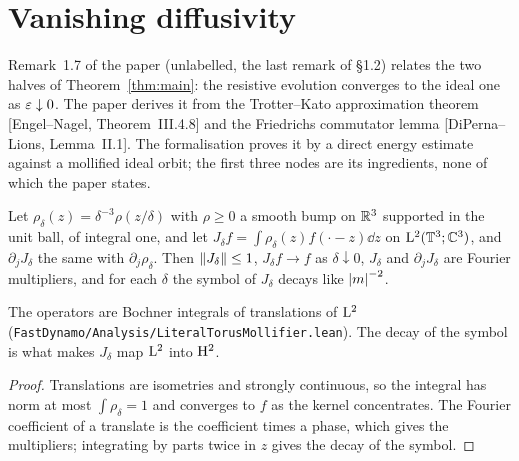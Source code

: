 \section{Vanishing diffusivity}

Remark~1.7 of the paper (unlabelled, the last remark of §1.2) relates the two halves of
Theorem~\ref{thm:main}: the resistive evolution converges to the ideal one as
$\varepsilon\downarrow0$.  The paper derives it from the Trotter--Kato approximation theorem
[Engel--Nagel, Theorem~III.4.8] and the Friedrichs commutator lemma [DiPerna--Lions,
Lemma~II.1].  The formalisation proves it by a direct energy estimate against a mollified ideal
orbit; the first three nodes are its ingredients, none of which the paper states.

\begin{lemma}
  \label{lem:vanishing:mollifier}
  \leanok
  Let $\rho_\delta(z)=\delta^{-3}\rho(z/\delta)$ with $\rho\geq0$ a smooth bump on $\mathbb{R}^3$
  supported in the unit ball, of integral one, and let $J_\delta f=\int\rho_\delta(z)f(\cdot-z)\dd z$
  on $\mathrm{L}^2(\mathbb{T}^3;\mathbb{C}^3)$, and $\partial_jJ_\delta$ the same with $\partial_j\rho_\delta$.  Then
  $\left\|J_\delta\right\|\leq1$, $J_\delta f\to f$ as $\delta\downarrow0$, $J_\delta$ and
  $\partial_jJ_\delta$ are Fourier multipliers, and for each $\delta$ the symbol of $J_\delta$
  decays like $\left\lvert m\right\rvert^{-2}$.
\end{lemma}

The operators are Bochner integrals of translations of $\mathrm{L}^2$
(\texttt{FastDynamo/Analysis/LiteralTorusMollifier.lean}).  The decay of the symbol is what makes
$J_\delta$ map $\mathrm{L}^2$ into $\mathrm{H}^2$.

\begin{proof}
  \leanok
  Translations are isometries and strongly continuous, so the integral has norm at most
  $\int\rho_\delta=1$ and converges to $f$ as the kernel concentrates.  The Fourier coefficient
  of a translate is the coefficient times a phase, which gives the multipliers; integrating by
  parts twice in $z$ gives the decay of the symbol.
\end{proof}

